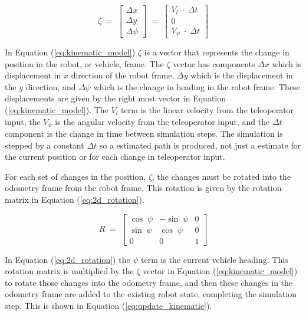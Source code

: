 \documentclass[12pt]{report}
\begin{document}
\begin{equation} \label{eq:kinematic_model}
\zeta \; =\; \left[ \begin{array}{c} \Delta x \\ \Delta y \\ \Delta \psi \end{array} \right]\; =\; \left[ \begin{array}{c} V_{l}\; \cdot \; \Delta t \\ 0 \\ V_{\psi }\; \cdot \; \Delta t \end{array} \right]
\end{equation}

In Equation (\ref{eq:kinematic_model}) $\zeta$ is a vector that represents the change in position in the robot, or vehicle, frame.  The $\zeta$ vector has components $\Delta x$ which is displacement in $x$ direction of the robot frame, $\Delta y$ which is the displacement in the $y$ direction, and $\Delta \psi$ which is the change in heading in the robot frame.  These displacements are given by the right most vector in Equation (\ref{eq:kinematic_model}).  The $V_{l}$ term is the linear velocity from the teleoperator input, the $V_{\psi}$ is the angular velocity from the teleoperator input, and the $\Delta t$ component is the change in time between simulation steps.  The simulation is stepped by a constant $\Delta t$ so a estimated path is produced, not just a estimate for the current position or for each change in teleoperator input.

For each set of changes in the position, $\zeta$, the changes must be rotated into the odometry frame from the robot frame.  This rotation is given by the rotation matrix in Equation (\ref{eq:2d_rotation}).

\begin{equation} \label{eq:2d_rotation}
R \; =\; \left[ \begin{array}{ccc} \cos \; \psi  & -\sin \; \psi  & 0 \\ \sin \; \psi  & \cos \; \psi  & 0 \\ 0 & 0 & 1 \end{array} \right]
\end{equation}

In Equation (\ref{eq:2d_rotation}) the $\psi$ term is the current vehicle heading.  This rotation matrix is multiplied by the $\zeta$ vector in Equation (\ref{eq:kinematic_model}) to rotate those changes into the odometry frame, and then these changes in the odometry frame are added to the existing robot state, completing the simulation step.  This is shown in Equation (\ref{eq:update_kinematic}).
\end{document}
